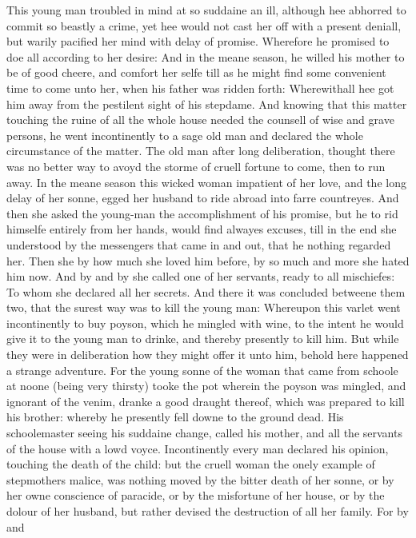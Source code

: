 This young man troubled in mind at so suddaine an ill, although hee abhorred to
commit so beastly a crime, yet hee would not cast her off with a present
deniall, but warily pacified her mind with delay of promise. Wherefore he
promised to doe all according to her desire: And in the meane season, he willed
his mother to be of good cheere, and comfort her selfe till as he might find
some convenient time to come unto her, when his father was ridden forth:
Wherewithall hee got him away from the pestilent sight of his stepdame. And
knowing that this matter touching the ruine of all the whole house needed the
counsell of wise and grave persons, he went incontinently to a sage old man and
declared the whole circumstance of the matter. The old man after long
deliberation, thought there was no better way to avoyd the storme of cruell
fortune to come, then to run away. In the meane season this wicked woman
impatient of her love, and the long delay of her sonne, egged her husband to
ride abroad into farre countreyes. And then she asked the young-man the
accomplishment of his promise, but he to rid himselfe entirely from her hands,
would find alwayes excuses, till in the end she understood by the messengers
that came in and out, that he nothing regarded her. Then she by how much she
loved him before, by so much and more she hated him now. And by and by she
called one of her servants, ready to all mischiefes: To whom she declared all
her secrets. And there it was concluded betweene them two, that the surest way
was to kill the young man: Whereupon this varlet went incontinently to buy
poyson, which he mingled with wine, to the intent he would give it to the young
man to drinke, and thereby presently to kill him. But while they were in
deliberation how they might offer it unto him, behold here happened a strange
adventure. For the young sonne of the woman that came from schoole at noone
(being very thirsty) tooke the pot wherein the poyson was mingled, and ignorant
of the venim, dranke a good draught thereof, which was prepared to kill his
brother: whereby he presently fell downe to the ground dead. His schoolemaster
seeing his suddaine change, called his mother, and all the servants of the
house with a lowd voyce. Incontinently every man declared his opinion, touching
the death of the child: but the cruell woman the onely example of stepmothers
malice, was nothing moved by the bitter death of her sonne, or by her owne
conscience of paracide, or by the misfortune of her house, or by the dolour of
her husband, but rather devised the destruction of all her family. For by and
